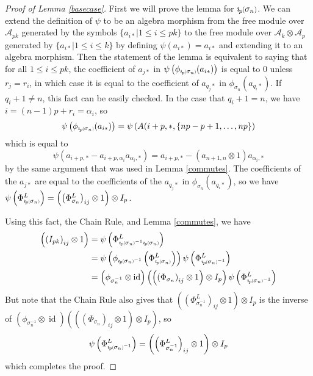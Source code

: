 \documentclass[11pt]{amsart}
\def\ltblue{blue!20!white}
\def\A{{\mathcal A}}
\def\s{{\sigma}}
\def\a{\alpha}
\newcommand*{\smallp}[1]{\scalebox{.75}{\ensuremath#1}}
\newcommand*{\subsmallp}[1]{\scalebox{.5}{\ensuremath#1}}
\newcommand{\pp}[2][p]{\imath_{\hspace*{-1pt}#1}\hspace*{-.5pt}\smallp(#2\smallp)}
\newcommand{\subpp}[2][p]{\imath_{\hspace*{-1pt}#1}\hspace*{-.5pt}\subsmallp(#2\subsmallp)}
\newcommand\id{\operatorname{id}}
\theoremstyle{definition}
\begin{document}
\begin{proof} [Proof of Lemma \ref{basecase}]\todo[color=\ltblue]{check}
First we will prove the lemma for $\pp{\s_n}$.  We can extend the definition of $\psi$ to be an algebra morphism from the free module over $\A_{pk}$ generated by the symbols $\{a_{i*}|1\le i\le pk\}$ to the free module over $\A_{k}\otimes \A_{p}$ generated by $\{a_{i*}|1\le i\le k\}$ by defining $\psi(a_{i*}) = a_{i*}$ and extending it to an algebra morphism.  Then the statement of the lemma is equivalent to saying that for all $1\le i\le pk$, the coefficient of $a_{j*}$ in $\psi\left(\phi_{\subpp{\s_n}}(a_{i*})\right)$ is equal to 0 unless $r_j = r_i$, in which case it is equal to the coefficient of $a_{q_j*}$ in $\phi_{\s_n}(a_{q_i*})$.  If $q_i + 1 \ne n$, this fact can be easily checked.  In the case that $q_i + 1 = n$, we have $i = (n-1)p + r_i = \a_i$, so
$$\psi\left(\phi_{\subpp{\s_n}}(a_{i*})\right) = \psi\left(A(i+p,*,\{np-p+1,\ldots,np\}\right)$$
\noindent which is equal to
$$\psi(a_{i+p,*} - a_{i+p,\a_i}a_{\a_i,*}) = a_{i+p,*} - (a_{n+1,n}\otimes 1)a_{\a_i,*}$$
by the same argument that was used in Lemma \ref{commutes}.  The coefficients of the $a_{j*}$ are equal to the coefficients of the $a_{q_j*}$ in $\phi_{\s_n}(a_{q_i*})$, so we have $\psi\left(\Phi_{\subpp{\s_n}}^L\right) = \left(\left(\Phi_{\s_n}^L\right)_{ij}\otimes 1\right)\otimes I_p$.

Using this fact, the Chain Rule, and Lemma \ref{commutes}, we have
\begin{align*}
\left(\left(I_{pk}\right)_{ij}\otimes 1\right) &= \psi\left(\Phi_{\subpp{\s_n}^{-1}\subpp{\s_n}}^L\right)\\
&= \psi\left(\phi_{\subpp{\s_n}^{-1}}\left(\Phi_{\subpp{\s_n}}^L\right)\right)\psi\left(\Phi_{\subpp{\s_n}^{-1}}^L\right)\\
&= \left(\phi_{\s_n^{-1}}\otimes \id\right)\left(\left(\left(\Phi_{\s_n}\right)_{ij}\otimes 1\right)\otimes I_p\right)\psi\left(\Phi_{\subpp{\s_n}^{-1}}^L\right)\\
\end{align*}
But note that the Chain Rule also gives that $\left(\left(\Phi_{\s_n^{-1}}^L\right)_{ij}\otimes 1\right)\otimes I_p$ is the inverse of $\left(\phi_{\s_n^{-1}}\otimes \id\right)\left(\left(\left(\Phi_{\s_n}\right)_{ij}\otimes 1\right)\otimes I_p\right)$, so 
$$\psi\left(\Phi_{\subpp{\s_n}^{-1}}^L\right) = \left(\left(\Phi_{\s_n^{-1}}^L\right)_{ij}\otimes 1\right)\otimes I_p$$
\noindent which completes the proof.
\end{proof}
\end{document}
